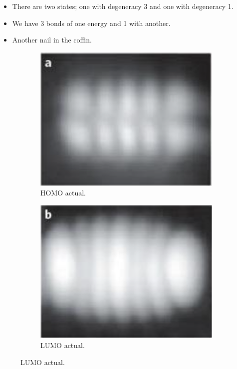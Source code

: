 \documentclass[../notes.tex]{subfiles}
\begin{document}
\begin{itemize}
    \begin{itemize}
        \item There are two states; one with degeneracy 3 and one with degeneracy 1.
        \item We have 3 bonds of one energy and 1 with another.
        \item Another nail in the coffin.
    \end{itemize}
    \begin{figure}[h!]
        \centering
        \begin{subfigure}[b]{0.3\linewidth}
            \centering
            \includegraphics[width=0.8\linewidth]{../ExtFiles/MO-picturea.png}
            \caption{HOMO actual.}
            \label{fig:MO-picturea}
        \end{subfigure}
        \begin{subfigure}[b]{0.3\linewidth}
            \centering
            \includegraphics[width=0.8\linewidth]{../ExtFiles/MO-pictureb.png}
            \caption{LUMO actual.}

\end{subfigure}
\end{figure}
\end{itemize}
\end{document}

